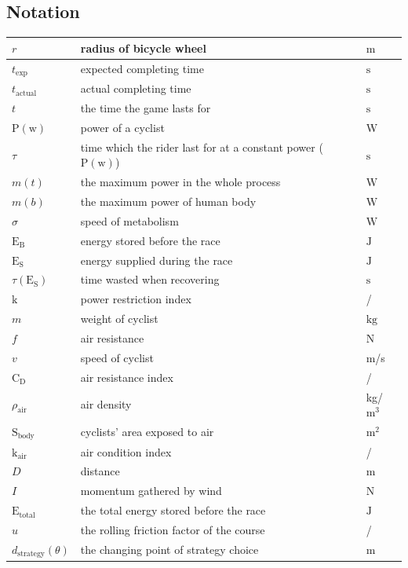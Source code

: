 \documentclass[12pt]{article}
\theoremstyle{definition}
\theoremstyle{remark}
\numberwithin{equation}{section}
\begin{document}
	\subsection{Notation}	
	\begin{tabular}{|l|l|l|}
		\hline
		$r$&radius of bicycle wheel&$\mathrm{m}$\\
		\hline
		$t_\mathrm{exp}$&expected completing time&$\mathrm{s}$\\
		\hline
		$t_\mathrm{actual}$&actual completing time&$\mathrm{s}$\\
		\hline
		$t$&the time the game lasts for&$\mathrm{s}$\\
		\hline
		$\mathrm{P}(\mathrm{w})$&power of a cyclist&W\\
		\hline
		$\tau$&time which the rider last for at a constant power ($\mathrm{P}(\mathrm{w})$)&$\mathrm{s}$\\
		\hline
		$m(t)$&the maximum power in the whole process&$\mathrm{W}$\\
		\hline
		$m(b)$&the maximum power of human body&$\mathrm{W}$\\
		\hline
		$\sigma$&speed of metabolism&$\mathrm{W}$\\ 
		\hline
		$\mathrm{E}_\mathrm{B}$&energy stored before the race&$\mathrm{J}$\\ 
		\hline
		$\mathrm{E}_\mathrm{S}$&energy supplied during the race&$\mathrm{J}$\\ 
		\hline
		$\tau(\mathrm{E}_\mathrm{S})$&time wasted when recovering&$\mathrm{s}$\\ 
		\hline
		$\mathrm{k}$&power restriction index&/\\ 
		\hline
		$m$&weight of cyclist&$\mathrm{kg}$\\
		\hline
		$f$&air resistance&$\mathrm{N}$\\ 
		\hline
		$v$&speed of cyclist&m/s\\ 
		\hline
		$\mathrm{C}_\mathrm{D}$&air resistance index&/\\ 
		\hline
		$\rho_\mathrm{air}$&air density&kg/$\mathrm{m}^3$\\ 
		\hline
		$\mathrm{S}_\mathrm{body}$&cyclists' area exposed to air&$\mathrm{m}^2$\\ 
		\hline
		$\mathrm{k}_\mathrm{air}$&air condition index&/\\ 
		\hline
		$D$&distance&m\\
		\hline
		$I$&momentum gathered by wind&$\mathrm{N}$\\ 
		\hline
		$\mathrm{E}_\mathrm{total}$&the total energy stored before the race&$\mathrm{J}$\\ 
		\hline
		\(u\) & the rolling friction factor of the course & / \\
		\hline
		\(d_{\mathrm{strategy}}\left(\theta\right)\) & the changing point of strategy choice & \(\mathrm{m}\) \\
	 	\hline
	\end{tabular}
\end{document}
